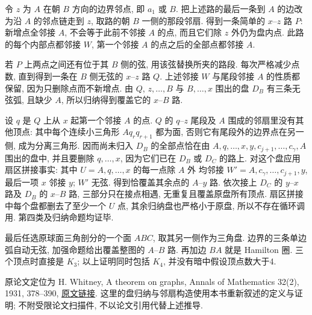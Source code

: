 \begin{solution}
令 $z$ 为 $A$ 在朝 $B$ 方向的边界邻点, 即 $a_1$ 或 $B$.
把上述路的最后一条到 $A$ 的边改为沿 $A$ 的邻点链走到 $z$,
取路的朝 $B$ 一侧的那段邻扇. 得到一条简单的 $x$--$z$ 路 $P$:
新增点全邻接 $A$, 不会等于此前不邻接 $A$ 的点,
而且它们除 $z$ 外仍为盘内点.
此路的每个内部点都邻接 $W$, 第一个邻接 $A$ 的点之后的全部点都邻接 $A$.

若 $P$ 上两点之间还有位于其 $B$ 侧的弦, 用该弦替换所夹的路段.
每次严格减少点数, 直到得到一条在 $B$ 侧无弦的 $x$--$z$ 路 $Q$.
上述邻接 $W$ 与尾段邻接 $A$ 的性质都保留, 因为只删除点而不新增点.
由 $Q$, $z,\ldots,B$ 与 $B,\ldots,x$ 围出的盘 $D_B$ 有三条无弦弧,
且缺少 $A$, 所以归纳得到覆盖它的 $x$--$B$ 路.

设 $q$ 是 $Q$ 上从 $x$ 起第一个邻接 $A$ 的点.
$Q$ 的 $q$--$z$ 尾段及 $A$ 围成的邻扇里没有其他顶点:
其中每个连续小三角形 $Aq_rq_{r+1}$ 都为面,
否则它有尾段外的边界点在另一侧, 成为分离三角形.
因而尚未归入 $D_B$ 的全部点恰在由
$A,q,\ldots,x,y,c_{j+1},\ldots,c_\gamma,A$ 围出的盘中,
并且要删除 $q,\ldots,x$, 因为它们已在 $D_B$ 或 $D_C$ 的路上.
对这个盘应用扇区拼接事实: 其中 $U=A,q,\ldots,x$ 的每一点除 $A$ 外
均邻接 $W'=A,c_\gamma,\ldots,c_{j+1},y$, 最后一项 $x$ 邻接 $y$;
$W'$ 无弦. 得到恰覆盖其余点的 $A$--$y$ 路.
依次接上 $D_C$ 的 $y$--$x$ 路及 $D_B$ 的 $x$--$B$ 路,
三部分只在接点相遇, 无重复且覆盖原盘所有顶点.
扇区拼接中每个盘都删去了至少一个 $U$ 点, 其余归纳盘也严格小于原盘,
所以不存在循环调用. 第四类及归纳命题均证毕.

最后任选原球面三角剖分的一个面 $ABC$, 取其另一侧作为三角盘.
边界的三条单边弧自动无弦, 加强命题给出覆盖整图的 $A$--$B$ 路.
再加边 $BA$ 就是 Hamilton 圈. 三个顶点时直接是 $K_3$;
以上证明同时包括 $K_4$, 并没有暗中假设顶点数大于4.

原论文定位为 H. Whitney, A theorem on graphs,
Annals of Mathematics 32(2), 1931, 378--390,
\href{https://doi.org/10.2307/1968197}{原文链接}.
这里的盘归纳与邻扇构造使用本书重新叙述的定义与证明;
不附受限论文扫描件, 不以论文引用代替上述推导.
\end{solution}
